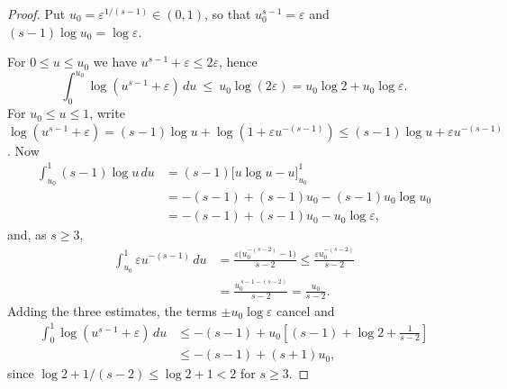 \documentclass[11pt,a4paper]{article}
\theoremstyle{plain}
\theoremstyle{definition}
\theoremstyle{remark}
\begin{document}
\label{pf:int}
\lemInt*
\begin{proof}
Put $u_0=\varepsilon^{1/(s-1)}\in(0,1)$, so that $u_0^{s-1}=\varepsilon$ and $(s-1)\log u_0=\log\varepsilon$.

For $0\le u\le u_0$ we have $u^{s-1}+\varepsilon\le2\varepsilon$, hence
\[
\int_0^{u_0}\log(u^{s-1}+\varepsilon)\,du\ \le\ u_0\log(2\varepsilon)=u_0\log2+u_0\log\varepsilon .
\]
For $u_0\le u\le1$, write $\log(u^{s-1}+\varepsilon)=(s-1)\log u+\log(1+\varepsilon u^{-(s-1)})\le(s-1)\log u+\varepsilon u^{-(s-1)}$. Now
\begin{align*}
\int_{u_0}^1(s-1)\log u\,du
&=(s-1)\bigl[u\log u-u\bigr]_{u_0}^1\\
&=-(s-1)+(s-1)u_0-(s-1)u_0\log u_0\\
&=-(s-1)+(s-1)u_0-u_0\log\varepsilon,
\end{align*}
and, as $s\ge3$,
\begin{align*}
\int_{u_0}^1\varepsilon u^{-(s-1)}\,du
&=\frac{\varepsilon\bigl(u_0^{-(s-2)}-1\bigr)}{s-2}
 \le \frac{\varepsilon u_0^{-(s-2)}}{s-2}\\
&=\frac{u_0^{\,s-1-(s-2)}}{s-2}=\frac{u_0}{s-2}.
\end{align*}
Adding the three estimates, the terms $\pm u_0\log\varepsilon$ cancel and
\begin{align*}
\int_0^1\log(u^{s-1}+\varepsilon)\,du
&\le -(s-1)+u_0\left[(s-1)+\log2+\frac1{s-2}\right]\\
&\le -(s-1)+(s+1)u_0,
\end{align*}
since $\log2+1/(s-2)\le\log2+1<2$ for $s\ge3$.
\end{proof}
\end{document}

